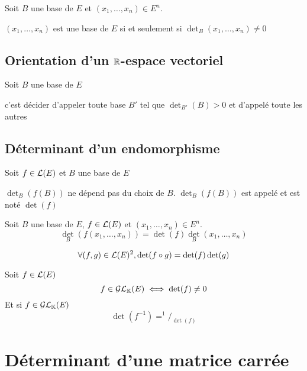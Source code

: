 \begin{prp}
  Soit $B$ une base de $E$ et $(x_1, \ldots, x_n) \in E^n$.

  $(x_1, \ldots, x_n)$ est une base de $E$ si et seulement si
  $\det_B(x_1, \ldots, x_n) \neq 0$
\end{prp}

\subsection{Orientation d'un $\mathbb{R}$-espace vectoriel}

\begin{dfn}
  Soit $B$ une base de $E$

   c'est décider d'appeler toute base
  $B'$ tel que $\det_{B'}(B) > 0$ 
  et d'appelé toute les autres 
\end{dfn}

\subsection{Déterminant d'un endomorphisme}

\begin{dfn}
  Soit $f \in \operatorname{\mathcal{L}}(E)$ et $B$ une base de $E$

  $\det_B(f(B))$ ne dépend pas du choix de $B$.
  $\det_B(f(B))$ est appelé 
  et est noté $\det(f)$
\end{dfn}

\begin{prp}
  Soit $B$ une base de $E$, $f \in \operatorname{\mathcal{L}}(E)$ et $(x_1, \ldots, x_n) \in E^n$.
  \[
    \det_B(f(x_1, \ldots, x_n)) = \det(f)\det_B(x_1, \ldots, x_n)
  \]
\end{prp}

\begin{prp}
  \[
    \forall (f, g) \in \operatorname{\mathcal{L}}(E)^2, \det(f \circ g) = \det(f) \det(g)
  \]
\end{prp}

\begin{prp}
  Soit $f \in \operatorname{\mathcal{L}}(E)$
  \[
    f \in \mathcal{GL}_{\mathbb{K}}(E) \iff \det(f) \neq 0
  \]
  Et si $f \in \mathcal{GL}_{\mathbb{K}}(E)$
  \[
    \det(f^{-1}) = ^1/_{\det(f)}
  \]
\end{prp}

\section{Déterminant d'une matrice carrée}

